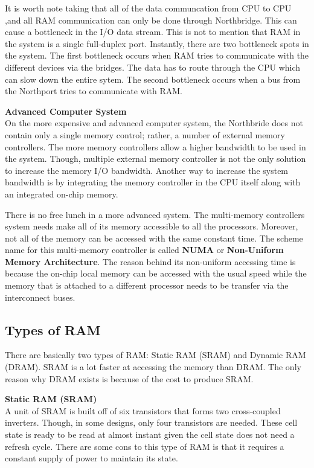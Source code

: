 \documentclass[journal]{IEEEtran}
\begin{document}
It is worth note taking that all of the data communcation from CPU to CPU
,and all RAM communication can only be done through Northbridge. This can 
cause a bottleneck in the I/O data stream. This is not to mention that RAM
in the system is a single full-duplex port. Instantly, there are two 
bottleneck spots in the system. The first bottleneck occurs when RAM tries
to communicate with the different devices via the bridges. The data has to 
route through the CPU which can slow down the entire sytem. The second
bottleneck occurs when a bus from the Northport tries to communicate with 
RAM. \newline

\textbf{Advanced Computer System\\}
On the more expensive and advanced computer system, the Northbride does not
contain only a single memory control; rather, a number of external memory
controllers. The more memory controllers allow a higher bandwidth to be 
used in the system. Though, multiple external memory controller is not the 
only solution to increase the memory I/O bandwidth. Another way to increase
the system bandwidth is by integrating the memory controller in the CPU 
itself along with an integrated on-chip memory. \newline

There is no free lunch in a more advanced system. The multi-memory 
controllers system needs make all of its memory accessible to all the 
processors. Moreover, not all of the memory can be accessed with the same
constant time. The scheme name for this multi-memory controller is called
\textbf{NUMA} or \textbf{Non-Uniform Memory Architecture}. The reason behind
its non-uniform accessing time is because the on-chip local memory can be
accessed with the usual speed while the memory that is attached to a 
different processor needs to be transfer via the interconnect buses.

\subsection{Types of RAM}
There are basically two types of RAM: Static RAM (SRAM) and Dynamic RAM 
(DRAM).  SRAM is a lot faster at accessing the memory than DRAM. The only
reason why DRAM exists is because of the cost to produce SRAM.\newline 

\textbf{Static RAM (SRAM)\\}
A unit of SRAM is built off of six transistors that forms two cross-coupled
inverters. Though, in some designs, only four transistors are needed.
These cell state is ready to be read at almost instant given the cell state
does not need a refresh cycle. There are some cons to this type of RAM is 
that it requires a constant supply of power to maintain its state.\newline
\end{document}
